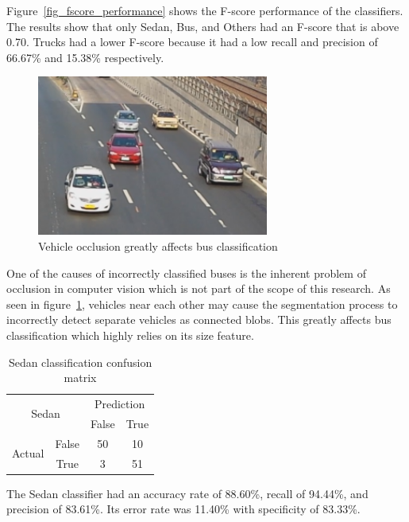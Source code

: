 \documentclass[conference]{IEEEtran}
\begin{document}
Figure~\ref{fig_fscore_performance} shows the F-score performance of the classifiers. The results show that only Sedan, Bus, and Others had an F-score that is above 0.70. Trucks had a lower F-score because it had a low recall and precision of 66.67\% and 15.38\% respectively. 

\begin{figure}[!ht]
\centering
\includegraphics[width=3in]{occlusion.png}
\caption{Vehicle occlusion greatly affects bus classification}
\label{fig_occlusion}
\end{figure}

One of the causes of incorrectly classified buses is the inherent problem of occlusion in computer vision which is not part of the scope of this research. As seen in figure~\ref{fig_occlusion}, vehicles near each other may cause the segmentation process to incorrectly detect separate vehicles as connected blobs. This greatly affects bus classification which highly relies on its size feature.


\begin{table}[]
\centering
\caption{Sedan classification confusion matrix}
\label{cm:sedan}
\begin{tabular}{|c|c|c|c|}
\hline
\multicolumn{2}{|c|}{\multirow{2}{*}{Sedan}} & \multicolumn{2}{c|}{Prediction} \\ \cline{3-4} 
\multicolumn{2}{|c|}{}                       & False          & True           \\ \hline
\multirow{2}{*}{Actual}         & False      & 50             & 10             \\ \cline{2-4} 
                                & True       &  3             & 51             \\ \hline
\end{tabular}
\end{table}

The Sedan classifier had an accuracy rate of 88.60\%, recall of 94.44\%, and precision of 83.61\%. Its error rate was 11.40\% with specificity of 83.33\%. 
\end{document}
